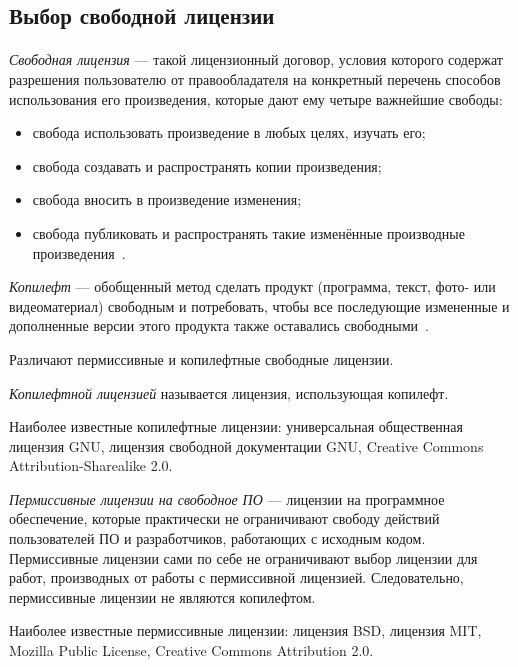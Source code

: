 \subsection{Выбор свободной лицензии}
\label{ssec:choice_free_licenses}

\paragraph{}
\textit{Свободная лицензия} --- такой лицензионный договор,
условия которого содержат разрешения пользователю от правообладателя
на конкретный перечень способов использования его произведения,
которые дают ему четыре важнейшие свободы:

\begin{itemize}
\item  
  свобода использовать произведение в любых целях, изучать его;
\item
  свобода создавать и распространять копии произведения;
\item
  свобода вносить в произведение изменения;
\item
  свобода публиковать и распространять такие изменённые производные произведения~\cite{wiki_free_license}.
\end{itemize}

\textit{Копилефт} --- обобщенный метод сделать продукт
(программа, текст, фото- или видеоматериал) свободным и потребовать,
чтобы все последующие измененные и дополненные версии этого продукта также оставались свободными~\cite{gnu_copyleft}.

Различают пермиссивные и копилефтные свободные лицензии.

\textit{Копилефтной лицензией} называется лицензия, использующая копилефт.

Наиболее известные копилефтные лицензии: универсальная общественная лицензия GNU, 
 лицензия свободной документации GNU, Creative Commons Attribution-Sharealike 2.0.

\textit{Пермиссивные лицензии на свободное ПО} --- лицензии на программное
обеспечение, которые практически не ограничивают свободу действий пользователей
ПО и разработчиков, работающих с исходным кодом.
Пермиссивные лицензии сами по себе не ограничивают выбор лицензии для работ,
производных от работы с пермиссивной лицензией. Следовательно, пермиссивные лицензии не являются копилефтом.

Наиболее известные пермиссивные лицензии: лицензия BSD, лицензия MIT, Mozilla Public License, Creative Commons Attribution 2.0.

